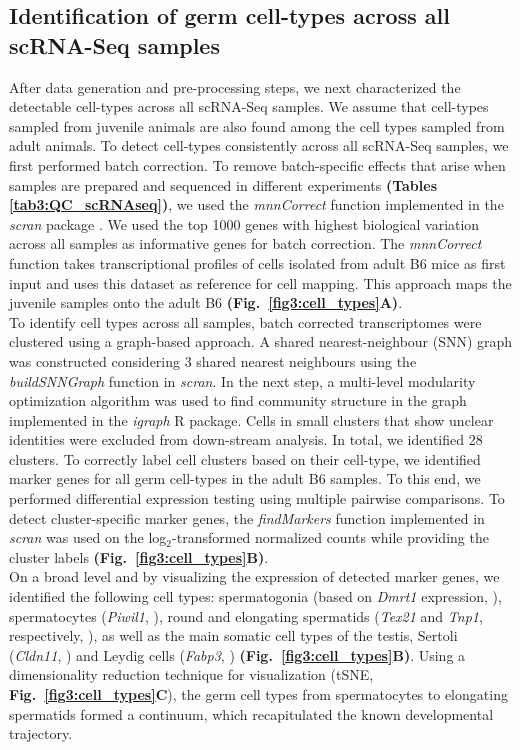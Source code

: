 \newpage

\subsection{Identification of germ cell-types across all scRNA-Seq samples}
\label{sec3:clustering}

After data generation and pre-processing steps, we next characterized the detectable cell-types across all scRNA-Seq samples. We assume that cell-types sampled from juvenile animals are also found among the cell types sampled from adult animals. To detect cell-types consistently across all scRNA-Seq samples, we first performed batch correction. To remove batch-specific effects that arise when samples are prepared and sequenced in different experiments \textbf{(Tables \ref{tab3:QC_scRNAseq})}, we used the \emph{mnnCorrect} function implemented in the \emph{scran} package \citep{Haghverdi2018}. We used the top 1000 genes with highest biological variation across all samples as informative genes for batch correction. The \emph{mnnCorrect} function takes transcriptional profiles of cells isolated from adult B6 mice as first input and uses this dataset as reference for cell mapping. This approach maps the juvenile samples onto the adult B6 \textbf{(Fig.~\ref{fig3:cell_types}A)}.\\

To identify cell types across all samples, batch corrected transcriptomes were clustered using a graph-based approach. A shared nearest-neighbour (SNN) graph \citep{Xu2015} was constructed considering 3 shared nearest neighbours using the \emph{buildSNNGraph} function in \emph{scran}. In the next step, a multi-level modularity optimization algorithm was used to find community structure in the graph \citep{Blondel2008} implemented in the \emph{igraph} R package. Cells in small clusters that show unclear identities were excluded from down-stream analysis. In total, we identified 28 clusters. To correctly label cell clusters based on their cell-type, we identified marker genes for all germ cell-types in the adult B6 samples. To this end, we performed differential expression testing using multiple pairwise comparisons. To detect cluster-specific marker genes, the \emph{findMarkers} function implemented in \emph{scran} was used on the log$_2$-transformed normalized counts while providing the cluster labels \textbf{(Fig.~\ref{fig3:cell_types}B)}. \\

On a broad level and by visualizing the expression of detected marker genes, we identified the following cell types: spermatogonia (based on \textit{Dmrt1} expression, \citep{Matson2010}), spermatocytes (\textit{Piwil1}, \citep{Deng2002}), round and elongating spermatids (\textit{Tex21} and \textit{Tnp1}, respectively, \citep{Fujii2002}), as well as the main somatic cell types of the testis, Sertoli (\textit{Cldn11}, \citep{Mazaud-Guittot2010}) and Leydig cells (\textit{Fabp3}, \citep{Oresti2013}) \textbf{(Fig.~\ref{fig3:cell_types}B)}. Using a dimensionality reduction technique for visualization (tSNE, \textbf{Fig.~\ref{fig3:cell_types}C}), the germ cell types from spermatocytes to elongating spermatids formed a continuum, which recapitulated the known developmental trajectory.

